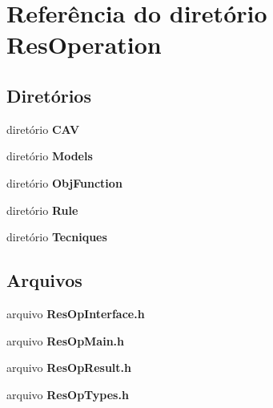 \section{Referência do diretório Res\+Operation}
\label{dir_d193cfa1be375267756f4b60154025b1}
\subsection*{Diretórios}
\begin{DoxyCompactItemize}
\item 
diretório {\bf C\+AV}
\item 
diretório {\bf Models}
\item 
diretório {\bf Obj\+Function}
\item 
diretório {\bf Rule}
\item 
diretório {\bf Tecniques}
\end{DoxyCompactItemize}
\subsection*{Arquivos}
\begin{DoxyCompactItemize}
\item 
arquivo {\bf Res\+Op\+Interface.\+h}
\item 
arquivo {\bf Res\+Op\+Main.\+h}
\item 
arquivo {\bf Res\+Op\+Result.\+h}
\item 
arquivo {\bf Res\+Op\+Types.\+h}
\end{DoxyCompactItemize}
